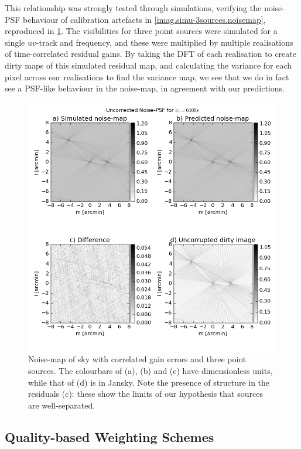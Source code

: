 \pg
This relationship was strongly tested through simulations, verifying the noise-PSF behaviour of calibration artefacts in \cref{imag.simu-3sources.noisemap}, reproduced in \cref{whatever}. The visibilities for three point sources were simulated for a single $uv$-track and frequency, and these were multiplied by multiple realisations of time-correlated residual gains. By taking the DFT of each realisation to create dirty maps of this simulated residual map, and calculating the variance for each pixel across our realisations to find the variance map, we see that we do in fact see a PSF-like behaviour in the noise-map, in agreement with our predictions.
\begin{figure}[h!]
\centering
\includegraphics[width=\textwidth]{images/Ctime6400-noisePSFandDirty-uncorr.png}
\caption{\label{whatever} {Noise-map of sky with correlated gain errors and three point sources. The colourbars of (a), (b) and (c) have dimensionless units, while that of (d) is in Jansky. Note the presence of structure in the residuals (c): these show the limits of our hypothesis that sources are well-separated.}}
\end{figure}

\subsection{Quality-based Weighting Schemes}\label{sec.qweights.conclusion}

